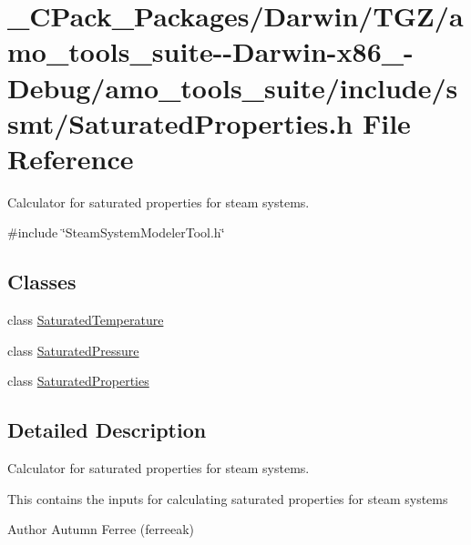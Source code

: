 \hypertarget{___c_pack___packages_2_darwin_2_t_g_z_2amo__tools__suite--_darwin-x86__64-_debug_2amo__tools__suf8ee427c400f9834bfea0ea48898e567}{}\section{\+\_\+\+C\+Pack\+\_\+\+Packages/\+Darwin/\+T\+G\+Z/amo\+\_\+tools\+\_\+suite-\/-\/\+Darwin-\/x86\+\_-\/\+Debug/amo\+\_\+tools\+\_\+suite/include/ssmt/\+Saturated\+Properties.h File Reference}
\label{___c_pack___packages_2_darwin_2_t_g_z_2amo__tools__suite--_darwin-x86__64-_debug_2amo__tools__suf8ee427c400f9834bfea0ea48898e567}


Calculator for saturated properties for steam systems.  


{\ttfamily \#include \char`\"{}Steam\+System\+Modeler\+Tool.\+h\char`\"{}}\newline
\subsection*{Classes}
\begin{DoxyCompactItemize}
\item 
class \hyperlink{class_saturated_temperature}{Saturated\+Temperature}
\item 
class \hyperlink{class_saturated_pressure}{Saturated\+Pressure}
\item 
class \hyperlink{class_saturated_properties}{Saturated\+Properties}
\end{DoxyCompactItemize}


\subsection{Detailed Description}
Calculator for saturated properties for steam systems. 

This contains the inputs for calculating saturated properties for steam systems

\begin{DoxyAuthor}{Author}
Autumn Ferree (ferreeak) 
\end{DoxyAuthor}
